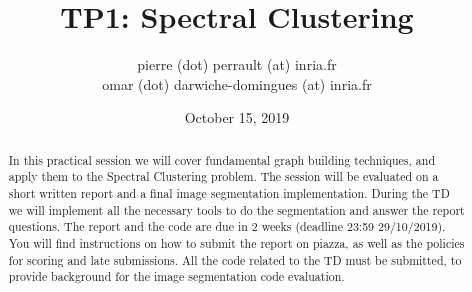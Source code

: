 \documentclass{article}
\begin{document}
\title{TP1: Spectral Clustering}
\author{pierre (dot) perrault (at) inria.fr \\ omar (dot) darwiche-domingues (at) inria.fr}
\date{October 15, 2019}
\maketitle

\begin{abstract}
    In this practical session we will cover fundamental graph building
    techniques, and apply them to the Spectral Clustering problem.
    The session will be evaluated on a short written report and a final
    image segmentation implementation. During
    the TD we will implement all the necessary tools to do the
    segmentation and answer the
    report questions.
    The report and the code are due in 2 weeks (deadline 23:59 29/10/2019).
    You will find instructions on how to submit the report on piazza,
    as well as the policies for scoring and late submissions.
    All the code related to the TD must be submitted,
    to provide background for the image segmentation code evaluation.

\end{abstract}

\newpage



%
%
%
%
\end{document}
